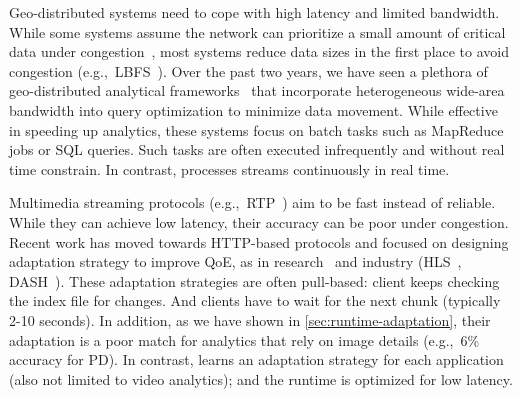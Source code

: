  Geo-distributed systems need to cope with high latency
and limited bandwidth. While some systems assume the network can prioritize a
small amount of critical data under congestion~\cite{cho2012surviving}, most
systems reduce data sizes in the first place to avoid congestion
(e.g.,~LBFS~\cite{muthitacharoen2001low}). Over the past two years, we have seen
a plethora of geo-distributed analytical
frameworks~\cite{vulimiri2015wananlytics, vulimiri2015global, pu2015low,
  kloudas2015pixida, viswanathan2016clarinet} that incorporate heterogeneous
wide-area bandwidth into query optimization to minimize data movement. While
effective in speeding up analytics, these systems focus on batch tasks such as
MapReduce jobs or SQL queries. Such tasks are often executed infrequently and
without real time constrain. In contrast, \sysname{} processes streams
continuously in real time.









 Multimedia streaming protocols
(e.g.,~RTP~\cite{schulzrinne2006rtp}) aim to be fast instead of reliable. While
they can achieve low latency, their accuracy can be poor under congestion.
Recent work has moved towards HTTP-based protocols and focused on designing
adaptation strategy to improve QoE, as in research~\cite{mao2017neural,
  sun2016cs2p, yin2015control} and industry (HLS~\cite{pantos2016http},
DASH~\cite{michalos2012dynamic, sodagar2011mpeg}). These adaptation strategies
are often pull-based: client keeps checking the index file for changes. And
clients have to wait for the next chunk (typically 2-10 seconds). In addition,
as we have shown in \autoref{sec:runtime-adaptation}, their adaptation is a poor
match for analytics that rely on image details (e.g.,~6\% accuracy for PD). In
contrast, \sysname{} learns an adaptation strategy for each application (also
not limited to video analytics); and the runtime is optimized for low latency.

